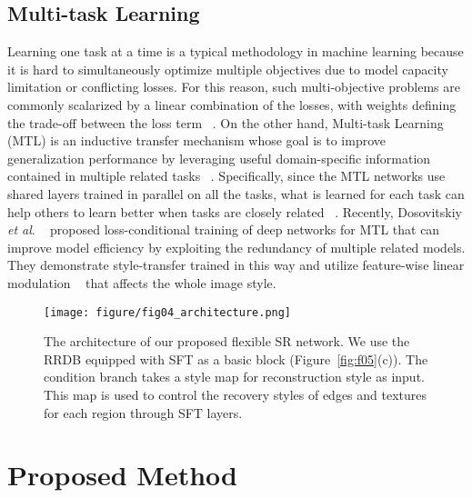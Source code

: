 \documentclass{article}
\newcommand{\etal}{\textit{et al}. }
\begin{document}
\subsection{Multi-task Learning}
Learning one task at a time is a typical methodology in machine learning because it is hard to simultaneously optimize multiple objectives due to model capacity limitation or conflicting losses. For this reason, such multi-objective problems are commonly scalarized by a linear combination of the losses, with weights defining the trade-off between the loss term ~\cite{caruana1997multitask}. On the other hand, Multi-task Learning (MTL) is an inductive transfer mechanism whose goal is to improve generalization performance by leveraging useful domain-specific information contained in multiple related tasks ~\cite{baxter2000model}. Specifically, since the MTL networks use shared layers trained in parallel on all the tasks, what is learned for each task can help others to learn better when tasks are closely related  ~\cite{caruana1997multitask, zhang2021survey}. Recently, Dosovitskiy \etal ~\cite{dosovitskiy2019you} proposed loss-conditional training of deep networks for MTL that can improve model efficiency by exploiting the redundancy of multiple related models. They demonstrate style-transfer trained in this way and utilize feature-wise linear modulation ~\cite{perez2018film} that affects the whole image style.

\begin{figure*}[!t]
  \centering
\begin{minipage}[t]{1.0\linewidth} 
  \centerline{\texttt{[image: figure/fig04\_architecture.png]}}
\end{minipage}
\caption{The architecture of our proposed flexible SR network. We use the RRDB equipped with SFT as a basic block (Figure~\ref{fig:f05}(c)). The condition branch takes a style map for reconstruction style as input. This map is used to control the recovery styles of edges and textures for each region through SFT layers.}
\label{fig:f04}
\end{figure*}

\section{Proposed Method}
\end{document}
